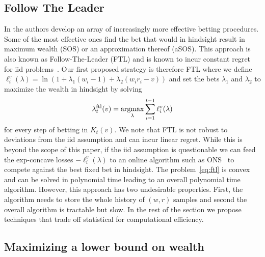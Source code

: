 \subsection{Follow The Leader}
In \cite{waudby-smith_variance-adaptive_2020} the authors develop
an array of increasingly more effective betting procedures. 
Some of the most effective ones find the bet that would in hindsight
result in maximum wealth (SOS) or an approximation thereof (aSOS).
This approach is also known as Follow-The-Leader (FTL) and is 
known to incur constant regret for iid 
problems~\cite{de2014follow}.
Our first proposed strategy 
is therefore FTL where we define 
$\ell_i^v(\lambda)=\ln(1+\lambda_1 (w_i-1)+\lambda_2(w_i r_i - v))$
and set the 
bets $\lambda_1$ and $\lambda_2$ to maximize the wealth in hindsight
by solving
\begin{equation}
\lambda_{t}^{\textrm{ftl}}(v) = \operatorname*{argmax}_{\lambda} \sum_{i=1}^{t-1}
\ell_{i}^{v}(\lambda)
\label{eq:ftl}
\end{equation}
for every step of betting in $K_t(v)$. 
We note that FTL is not robust 
to deviations from the iid assumption and 
can incur linear regret. While this is 
beyond the scope of this paper, if 
the iid assumption is questionable we can feed
the exp-concave losses 
$-\ell_i^v(\lambda)$
to an online algorithm such as 
ONS~\cite{hazan2007logarithmic} 
to compete against the best fixed bet in hindsight.
The problem~\eqref{eq:ftl} is convex and can be solved in polynomial time
leading to an overall polynomial time algorithm. However,
this approach has two undesirable properties. First, the 
algorithm needs to store the whole history of $(w,r)$ samples
and second the overall algorithm is tractable but slow.
In the rest of the section we propose techniques that trade off
statistical for computational efficiency.

\subsection{Maximizing a lower bound on wealth}

